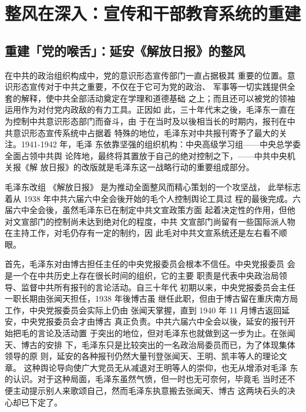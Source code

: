 \chapter{整风在深入：宣传和干部教育系统的重建}
\section{重建「党的喉舌」：延安《解放日报》的整风}

在中共的政治组织构成中，党的意识形态宣传部门一直占据极其
重要的位置。意识形态宣传对于中共之重要，不仅在于它可为党的政治、
军事等一切实践提供全套的解释，使中共全部活动奠定在学理和道德基础
之上；而且还可以被党的领袖运用作为对付党内政敌的有力工具。正因如
此，三十年代末之後，毛泽东一直在为控制中共意识形态部门而奋斗，由
于在当时及以後相当长的时期内，报刊在中共意识形态宣传系统中占据着
特殊的地位，毛泽东对中共报刊寄予了最大的关注。1941-1942 年，毛泽
东依靠坚强的组织机构：中央高级学习组——中央总学委全面占领中共舆
论阵地，最终将其置放于自己的绝对控制之下，——中共中央机关报《解
放日报》的改版就是毛泽东这一战略行动的重要组成部分。

毛泽东改组
《解放日报》
是为推动全面整风而精心策划的一个攻坚战，
此举标志着从 1938 年中共六届六中全会後开始的毛个人控制舆论工具过
程的最後完成。六届六中全会後，虽然毛泽东已在制定中共文宣政策方面
起着决定性的作用，但他对文宣部门的控制尚未达到绝对化的程度，中共
文宣部门尚留有一些国际派人物在主持工作，对毛仍存有一定的制约，因
此毛对中共文宣系统还是左右看不顺眼。

首先，毛泽东对由博古担任主任的中央党报委员会根本不信任。中央党报委员
会是一个在中共历史上存在很长时间的组织，它的主要
职责是代表中央政治局领导、监督中共所有报刊的言论活动。自三十年代
初期以来，中央党报委员会主任一职长期由张闻天担任，1938 年後博古虽
继任此职，但由于博古留在重庆南方局工作，中央党报委员会实际上仍由
张闻天掌握，直到 1940 年 11 月博古返回延安，中央党报委员会才由博古
真正负责。中共六届六中全会以後，延安的报刊开始把毛的言论及活动置
于突出的地位，但对毛泽东也就做到这一步为止。在张闻天、博古的安排
下，毛泽东只是比较突出的一名政治局委员而已，为了体现集体领导的原
则，延安的各种报刊仍然大量刊登张闻天、王明、凯丰等人的理论文章。
这种舆论导向使广大党员无从减退对王明等人的崇仰，也无从增添对毛泽
东的认识。对于这种局面，毛泽东虽然气愤，但一时也无可奈何，毕竟毛
当时还不便主动提示别人来歌颂自己，然而毛泽东执意搬去张闻天、博古
这两块石头的决心却已下定了。

